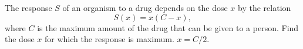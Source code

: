 {The response $S$ of an organism to a drug depends on the dose $x$ by the relation
\[
S(x) = x(C-x),
\]
where $C$ is the maximum amount of the drug that can be given to a person.
Find the dose $x$ for which the response is maximum.
}
{$x=C/2$.
}
{
}
